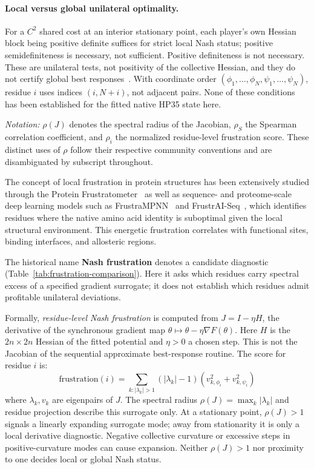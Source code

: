 \documentclass[12pt,a4paper]{article}
\theoremstyle{remark}
\begin{document}
\paragraph{Local versus global unilateral optimality.}
For a $C^2$ shared cost at an interior stationary point, each player's own Hessian block being positive definite suffices for strict local Nash status; positive semidefiniteness is necessary, not sufficient. Positive definiteness is not necessary. These are unilateral tests, not positivity of the collective Hessian, and they do not certify global best responses~\citep{RatliffBurdenSastry2016}. With coordinate order $(\phi_1,\ldots,\phi_N,\psi_1,\ldots,\psi_N)$, residue $i$ uses indices $(i,N+i)$, not adjacent pairs. None of these conditions has been established for the fitted native HP35 state here.




\noindent\textit{Notation:} $\rho(J)$ denotes the spectral radius of the Jacobian, $\rho_S$ the Spearman correlation coefficient, and $\rho_i$ the normalized residue-level frustration score. These distinct uses of $\rho$ follow their respective community conventions and are disambiguated by subscript throughout.

The concept of local frustration in protein structures has been extensively studied through the Protein Frustratometer~\citep{Ferreiro2007,Ferreiro2014} as well as sequence- and proteome-scale deep learning models such as FrustraMPNN~\citep{Beining2026} and FrustrAI-Seq~\citep{Leusch2026}, which identifies residues where the native amino acid identity is suboptimal given the local structural environment. This energetic frustration correlates with functional sites, binding interfaces, and allosteric regions.

The historical name \textbf{Nash frustration} denotes a candidate diagnostic (Table~\ref{tab:frustration-comparison}). Here it asks which residues carry spectral excess of a specified gradient surrogate; it does not establish which residues admit profitable unilateral deviations.

Formally, \emph{residue-level Nash frustration} is computed from $J=I-\eta H$, the derivative of the synchronous gradient map $\theta\mapsto\theta-\eta\nabla F(\theta)$. Here $H$ is the $2n\times2n$ Hessian of the fitted potential and $\eta>0$ a chosen step. This is not the Jacobian of the sequential approximate best-response routine. The score for residue $i$ is:
\begin{equation}
\text{frustration}(i) = \sum_{k: |\lambda_k| > 1} (|\lambda_k| - 1) \left( v_{k,\phi_i}^2 + v_{k,\psi_i}^2 \right)
\end{equation}
where $\lambda_k,v_k$ are eigenpairs of $J$. The spectral radius $\rho(J)=\max_k|\lambda_k|$ and residue projection describe this surrogate only. At a stationary point, $\rho(J)>1$ signals a linearly expanding surrogate mode; away from stationarity it is only a local derivative diagnostic. Negative collective curvature or excessive steps in positive-curvature modes can cause expansion. Neither $\rho(J)>1$ nor proximity to one decides local or global Nash status.
\end{document}
